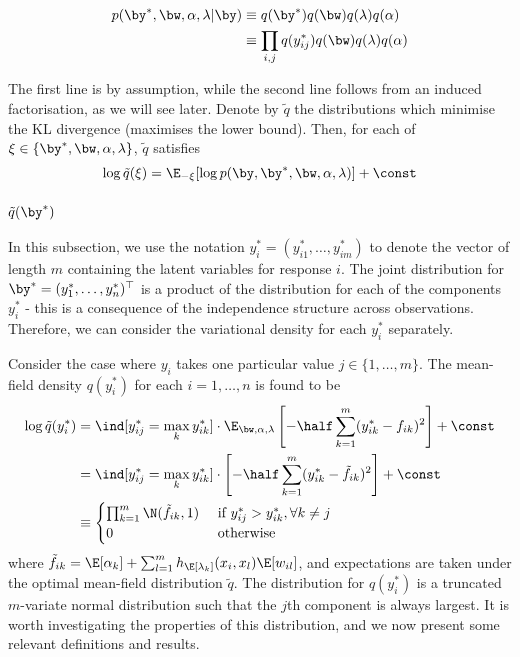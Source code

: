 \begin{align*}
  p(\by^*, \bw, \alpha, \lambda | \by) 
  &\equiv q(\by^*)q(\bw)q(\lambda)q(\alpha) \\
  &\equiv \prod_{i,j} q(y_{ij}^*)q(\bw)q(\lambda)q(\alpha)
\end{align*}

The first line is by assumption, while the second line follows from an induced factorisation, as we will see later. Denote by $\tilde q$ the distributions which minimise the KL divergence (maximises the lower bound). Then, for each of $\xi \in \{ \by^*, \bw, \alpha, \lambda \}$, $\tilde q$ satisfies
\[
  \log \tilde q(\xi) = \E_{-\xi} [\log p(\by, \by^*, \bw, \alpha, \lambda)] + \const
\]

\subsubsection{$\tilde q(\by^*)$}

In this subsection, we use the notation $y_i^* = (y_{i1}^*, \dots, y_{im}^*)$ to denote the vector of length $m$ containing the latent variables for response $i$. The joint distribution for $\by^* = (y_1^*, \dots, y_n^*)^\top$ is a product of the distribution for each of the components $y_i^*$ - this is a consequence of the independence structure across observations. Therefore, we can consider the variational density for each $y_i^*$ separately.

Consider the case where $y_i$ takes one particular value $j \in \{1,\dots,m\}$. The mean-field density $q(y_{i}^*)$ for each $i=1,\dots,n$ is found to be
\begin{align*}
  \log \tilde q(y_{i}^*) 
  &=  \ind[y_{ij}^* = \max_k y_{ik}^*] \cdot \E_{\bw, \alpha, \lambda} \left[ -\half \sum_{k=1}^m(y_{ik}^* - f_{ik})^2  \right] + \const \\
  &= \ind[y_{ij}^* = \max_k y_{ik}^*] \cdot \left[ -\half \sum_{k=1}^m(y_{ik}^* - \tilde f_{ik})^2  \right] + \const \\*
  &\equiv
  \begin{cases}
    \prod_{k=1}^m \N(\tilde f_{ik}, 1) & \text{ if } y_{ij}^* > y_{ik}^*, \forall k \neq j \\
    0 & \text{ otherwise} \\
  \end{cases}
\end{align*}
where $\tilde f_{ik} = \E[\alpha_k] + \sum_{l=1}^m h_{\E[\lambda_k]}(x_i, x_l)\E[w_{il}]$, and expectations are taken under the optimal mean-field distribution $\tilde q$. The distribution for $q(y_i^*)$ is a truncated $m$-variate normal distribution such that the $j$th component is always largest. It is worth investigating the properties of this distribution, and we now present some relevant definitions and results.

